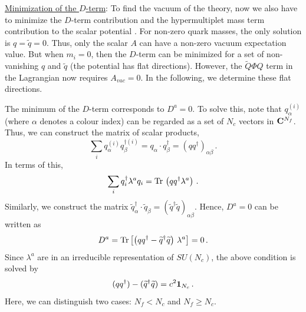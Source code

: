 \noindent\underline{Minimization of the $D$-term}:
To find the vacuum of the theory, now we also have to minimize the
$D$-term contribution and the hypermultiplet mass term contribution to
the scalar potential \cite{DDS,ADS}. For non-zero quark masses, the
only solution is 
$q=\widetilde q =0$. Thus, only the scalar $A$ can have a non-zero
vacuum expectation value. But when $m_i=0$, then the $D$-term can be
minimized for a set of non-vanishing $q$ and $\widetilde q$ (the
potential has flat directions). However, the $\widetilde Q\Phi Q$ term
in the Lagrangian now requires $A_{vac}=0$. In the following, we
determine these flat directions.

The minimum of the $D$-term corresponds to $D^a=0$. To solve this,
note that $q^{(i)}_\alpha$ (where $\alpha$ denotes a colour index) can
be regarded as a set of $N_c$ vectors in ${\bf C}^{N_f}$. Thus, we can
construct the matrix of scalar products, 
$$
\sum_i q^{(i)}_\alpha q^{\dagger (i)}_\beta=q_\alpha\cdot
q^\dagger_\beta=(qq^\dagger)_{\alpha\beta}\,.
$$
In terms of this,
$$
\sum_i q^\dagger_i\lambda^aq_i={\rm Tr}\,\left(qq^\dagger
\lambda^a\right) \,.
$$
Similarly, we construct the matrix $\widetilde q_\alpha^\dagger \cdot
\widetilde q_\beta = (\widetilde q^\dagger\widetilde q)_{\alpha\beta}$.
Hence, $D^a=0$ can be written as 
$$
D^a={\rm Tr}\left[\left(qq^\dagger-\widetilde q^\dagger
\widetilde q\right)\,\lambda^a\right]=0 \,.
$$
Since $\lambda^a$ are in an irreducible representation of $SU(N_c)$,
the above condition is solved by 
\begin{equation}
(qq^\dagger) - (\widetilde q^\dagger\widetilde q)=c^2{\bf 1}_{N_c}\,.
\label{D=0} 
\end{equation}
Here, we can distinguish two cases: $N_f < N_c$ and $N_f\geq N_c$.

